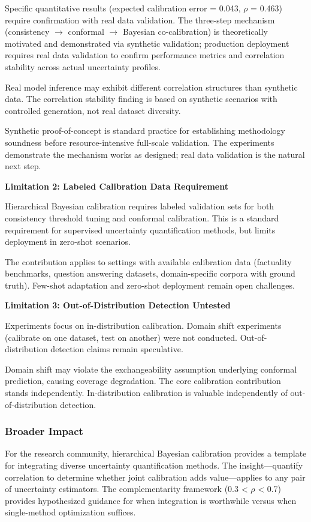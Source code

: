 Specific quantitative results (expected calibration error = 0.043, $\rho$ = 0.463) require confirmation with real data validation. The three-step mechanism (consistency $\rightarrow$ conformal $\rightarrow$ Bayesian co-calibration) is theoretically motivated and demonstrated via synthetic validation; production deployment requires real data validation to confirm performance metrics and correlation stability across actual uncertainty profiles.

Real model inference may exhibit different correlation structures than synthetic data. The correlation stability finding is based on synthetic scenarios with controlled generation, not real dataset diversity.

Synthetic proof-of-concept is standard practice for establishing methodology soundness before resource-intensive full-scale validation. The experiments demonstrate the mechanism works as designed; real data validation is the natural next step.

\textbf{Limitation 2: Labeled Calibration Data Requirement}

Hierarchical Bayesian calibration requires labeled validation sets for both consistency threshold tuning and conformal calibration. This is a standard requirement for supervised uncertainty quantification methods, but limits deployment in zero-shot scenarios.

The contribution applies to settings with available calibration data (factuality benchmarks, question answering datasets, domain-specific corpora with ground truth). Few-shot adaptation and zero-shot deployment remain open challenges.

\textbf{Limitation 3: Out-of-Distribution Detection Untested}

Experiments focus on in-distribution calibration. Domain shift experiments (calibrate on one dataset, test on another) were not conducted. Out-of-distribution detection claims remain speculative.

Domain shift may violate the exchangeability assumption underlying conformal prediction, causing coverage degradation. The core calibration contribution stands independently. In-distribution calibration is valuable independently of out-of-distribution detection.

\subsubsection{Broader Impact}

For the research community, hierarchical Bayesian calibration provides a template for integrating diverse uncertainty quantification methods. The insight---quantify correlation to determine whether joint calibration adds value---applies to any pair of uncertainty estimators. The complementarity framework (0.3 < $\rho$ < 0.7) provides hypothesized guidance for when integration is worthwhile versus when single-method optimization suffices.

